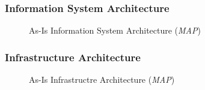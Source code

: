 \subsubsection{Information System Architecture}
\begin{center}
	\begin{figure}[H]
		\centering
		\setlength\fboxsep{7pt}
		\setlength\fboxrule{0.5pt}
		\caption{As-Is Information System Architecture (\emph{MAP})}
		\label{fig:map_information_as_is}
	\end{figure}
\end{center}
%
\subsubsection{Infrastructure Architecture}
\begin{center}
	\begin{figure}[H]
		\centering
		\setlength\fboxsep{7pt}
		\setlength\fboxrule{0.5pt}
		\caption{As-Is Infrastructre Architecture (\emph{MAP})}
		\label{fig:map_information_as_is}
	\end{figure}
\end{center}
